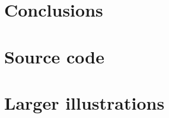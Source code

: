 \documentclass[12pt]{report}
\begin{document}
\chapter{Conclusions}
    


\newpage
\renewcommand{\bibname}{References}
 


\appendix
\begin{appendices}
\chapter{Source code}
    
\chapter{Larger illustrations}
\end{appendices}
\end{document}
